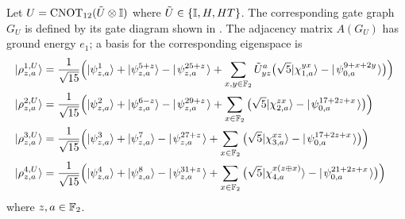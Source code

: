 \documentclass[../thesis-main/thesis-main]{subfiles}
\begin{document}
\begin{lemma}\label{lem:2qub_gate}
Let $U=\mathrm{CNOT}_{12}(\tilde U\otimes\mathbb{I})$ where $\tilde U\in\{\mathbb{I},H,HT\}$. The corresponding gate graph $G_U$ is defined by its gate diagram shown in . The adjacency matrix $A(G_U)$ has ground energy $e_{1}$; a basis for the corresponding eigenspace is
\begin{align}
  |\rho_{z,a}^{1,U}\rangle & =\frac{1}{\sqrt{15}}\Big(|\psi_{z,a}^{1}\rangle+|\psi_{z,a}^{5+z}\rangle - |\mspace{2mu} \psi_{z,a}^{25+z} \mspace{2mu} \rangle
  	+\sum_{x,y\in\mathbb{F}_2}\tilde U^a_{yz}\big(\sqrt{5}  |\chi_{1,a}^{yx}\rangle-|\mspace{2mu} \psi_{0,a}^{9+x + 2y} \mspace{2mu} \rangle \big) \Big)\label{eq:rho1}\
 \\
  |\rho_{z,a}^{2,U}\rangle & = \frac{1}{\sqrt{15}}\Big(|\psi_{z,a}^{2}\rangle+|\psi_{z,a}^{6-z}\rangle -|\mspace{2mu} \psi_{z,a}^{29+z} \mspace{2mu} \rangle
  	+\sum_{x\in\mathbb{F}_2} \big(\sqrt{5} |\chi_{2,a}^{zx}\rangle - |\mspace{2mu} \psi_{0,a}^{17+2z + x} \mspace{2mu} \rangle\big)\Big)\label{eq:rho2}\\
  |\rho_{z,a}^{3,U}\rangle & = \frac{1}{\sqrt{15}}\Big(|\psi_{z,a}^{3}\rangle+|\psi_{z,a}^{7}\rangle  -|\mspace{2mu} \psi_{z,a}^{27+z} \mspace{2mu} \rangle
  	+\sum_{x\in\mathbb{F}_2}\big(\sqrt{5} |\chi_{3,a}^{xz}\rangle- |\mspace{2mu} \psi_{0,a}^{17+2z + x} \mspace{2mu} \rangle\big)\Big) \label{eq:rho3} \\
  |\rho_{z,a}^{4,U}\rangle & =\frac{1}{\sqrt{15}}\Big(|\psi_{z,a}^{4}\rangle+|\psi_{z,a}^{8}\rangle -|\mspace{2mu} \psi_{z,a}^{31+z} \mspace{2mu} \rangle
  	+\sum_{x\in\mathbb{F}_2}\big(\sqrt{5}|\chi_{4,a}^{x\left(z\oplus x\right)}\rangle - |\mspace{2mu} \psi_{0,a}^{21+2z + x} \mspace{2mu} \rangle  \big)\Big)\label{eq:rho4}
\end{align}
where $z,a\in\mathbb{F}_2$.
\end{lemma}
\end{document}
